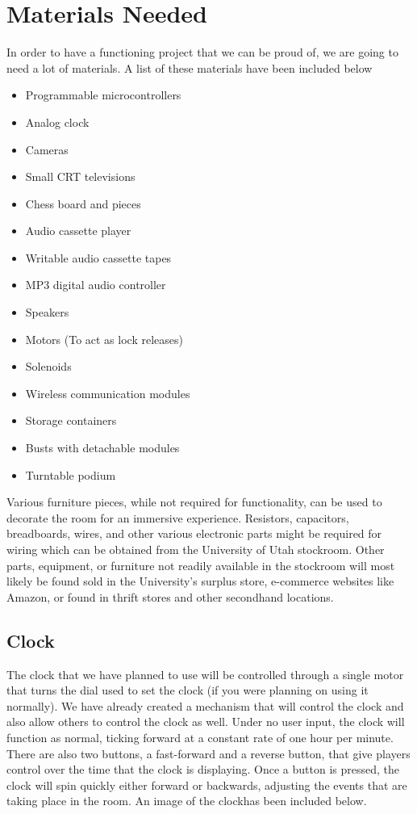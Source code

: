 \documentclass[conference]{IEEEtran}
\begin{document}
\section{Materials Needed}
In order to have a functioning project that we can be proud of, we are going to need a lot of materials.
A list of these materials have been included below
\begin{itemize}
    \item Programmable microcontrollers
    \item Analog clock
    \item Cameras
    \item Small CRT televisions
    \item Chess board and pieces
    \item Audio cassette player
    \item Writable audio cassette tapes
    \item MP3 digital audio controller
    \item Speakers
    \item Motors (To act as lock releases)
    \item Solenoids
    \item Wireless communication modules
    \item Storage containers
    \item Busts with detachable modules
    \item Turntable podium
\end{itemize}

Various furniture pieces, while not required for functionality, can be used to decorate
the room for an immersive experience. Resistors, capacitors, breadboards, wires, and other
various electronic parts might be required for wiring which can be obtained from the University
of Utah stockroom. Other parts, equipment, or furniture not readily available in the stockroom
will most likely be found sold in the University's surplus store, e-commerce websites like
Amazon, or found in thrift stores and other secondhand locations.

\subsection*{Clock}
The clock that we have planned to use will be controlled through a single motor that turns the
dial used to set the clock (if you were planning on using it normally). We have already created
a mechanism that will control the clock and also allow others to control the clock as well. Under
no user input, the clock will function as normal, ticking forward at a constant rate of one hour per
minute. There are also two buttons, a fast-forward and a reverse button, that give players control
over the time that the clock is displaying. Once a button is pressed, the clock will spin quickly
either forward or backwards, adjusting the events that are taking place in the room. An image of
the clockhas been included below.
\end{document}

